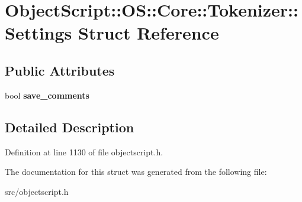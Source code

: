 \hypertarget{struct_object_script_1_1_o_s_1_1_core_1_1_tokenizer_1_1_settings}{}\section{Object\+Script\+:\+:OS\+:\+:Core\+:\+:Tokenizer\+:\+:Settings Struct Reference}
\label{struct_object_script_1_1_o_s_1_1_core_1_1_tokenizer_1_1_settings}
\subsection*{Public Attributes}
\begin{DoxyCompactItemize}
\item 
bool {\bfseries save\+\_\+comments}\hypertarget{struct_object_script_1_1_o_s_1_1_core_1_1_tokenizer_1_1_settings_abd75643af0a8723de1c56d489d55de9a}{}\label{struct_object_script_1_1_o_s_1_1_core_1_1_tokenizer_1_1_settings_abd75643af0a8723de1c56d489d55de9a}

\end{DoxyCompactItemize}


\subsection{Detailed Description}


Definition at line 1130 of file objectscript.\+h.



The documentation for this struct was generated from the following file\+:\begin{DoxyCompactItemize}
\item 
src/objectscript.\+h\end{DoxyCompactItemize}

